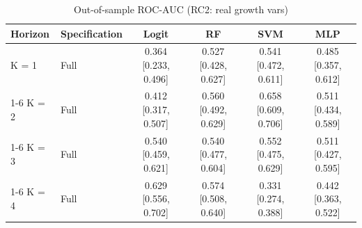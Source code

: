 \begin{table}

\caption{\label{tab:roc_ci_rc2}Out-of-sample ROC-AUC (RC2: real growth vars)}
\centering
\begin{tabular}[t]{llcccc}
\toprule
Horizon & Specification & Logit & RF & SVM & MLP\\
\midrule
K = 1 & Full & 0.364 [0.233, 0.496] & 0.527 [0.428, 0.627] & 0.541 [0.472, 0.611] & 0.485 [0.357, 0.612]\\
\cmidrule{1-6}
K = 2 & Full & 0.412 [0.317, 0.507] & 0.560 [0.492, 0.629] & 0.658 [0.609, 0.706] & 0.511 [0.434, 0.589]\\
\cmidrule{1-6}
K = 3 & Full & 0.540 [0.459, 0.621] & 0.540 [0.477, 0.604] & 0.552 [0.475, 0.629] & 0.511 [0.427, 0.595]\\
\cmidrule{1-6}
K = 4 & Full & 0.629 [0.556, 0.702] & 0.574 [0.508, 0.640] & 0.331 [0.274, 0.388] & 0.442 [0.363, 0.522]\\
\bottomrule
\end{tabular}
\end{table}
